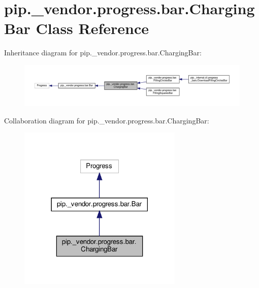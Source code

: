 \hypertarget{classpip_1_1__vendor_1_1progress_1_1bar_1_1ChargingBar}{}\section{pip.\+\_\+vendor.\+progress.\+bar.\+Charging\+Bar Class Reference}
\label{classpip_1_1__vendor_1_1progress_1_1bar_1_1ChargingBar}


Inheritance diagram for pip.\+\_\+vendor.\+progress.\+bar.\+Charging\+Bar\+:
\nopagebreak
\begin{figure}[H]
\begin{center}
\leavevmode
\includegraphics[width=350pt]{classpip_1_1__vendor_1_1progress_1_1bar_1_1ChargingBar__inherit__graph}
\end{center}
\end{figure}


Collaboration diagram for pip.\+\_\+vendor.\+progress.\+bar.\+Charging\+Bar\+:
\nopagebreak
\begin{figure}[H]
\begin{center}
\leavevmode
\includegraphics[width=222pt]{classpip_1_1__vendor_1_1progress_1_1bar_1_1ChargingBar__coll__graph}
\end{center}
\end{figure}
